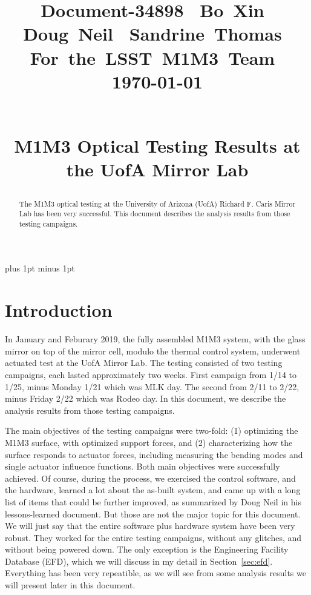 \documentclass [twoside,openbib,12pt]{article}
\begin{document}
\normalsize
\parskip=5pt plus 1pt minus 1pt

\title{ \hfill\parbox{4cm}{\normalsize
                          \hbox{Document-34898          \hfill}
                          \hbox{Bo Xin          \hfill}
                          \hbox{Doug Neil         \hfill}
                          \hbox{Sandrine Thomas          \hfill}
                           \hbox{For the LSST M1M3 Team          \hfill}
                          \hbox{\today             \hfill}}\\[1cm]
{\bf
M1M3 Optical Testing Results at the UofA Mirror Lab
}
}
\author{}
\date{}

\maketitle
\begin{abstract}
  The M1M3 optical testing at the University of Arizona 
  (UofA) Richard F. Caris Mirror Lab has
  been very successful.
This document describes the analysis results from those testing campaigns.
\end{abstract}

\tableofcontents


\section{Introduction}
\label{sec:intro}

In January and Feburary 2019, the fully assembled M1M3 system, with
the glass mirror on top of the mirror cell, modulo the thermal control
system, underwent actuated test at the UofA Mirror Lab.
The testing consisted of two testing campaigns, each lasted
approximately two weeks.
First campaign from 1/14 to 1/25, minus Monday 1/21 which was MLK day.
The second from 2/11 to 2/22, minus Friday 2/22 which was Rodeo day.
In this document, we describe the analysis results from those testing
campaigns.

The main objectives of the testing campaigns were two-fold:
(1) optimizing the M1M3 surface, with optimized support forces, and
(2) characterizing how the surface responds to actuator forces,
including measuring the bending modes and single actuator influence functions.
Both main objectives were successfully achieved.
Of course, during the process, we exercised the control software, and
the hardware, learned a lot about the as-built system, and came up with a long list of items that could be
further improved, as summarized by Doug Neil in his lessons-learned document.
But those are not the major topic for this document.
We will just say that the entire software plus hardware system have
been very robust.
They worked for the entire testing campaigns, without
any glitches, and without being powered down.
The only exception is the Engineering Facility Database (EFD), which
we will discuss in my detail in Section~\ref{sec:efd}.
Everything has been very
repeatible, as we will see from some analysis results we will present
later in this document.
\end{document}
